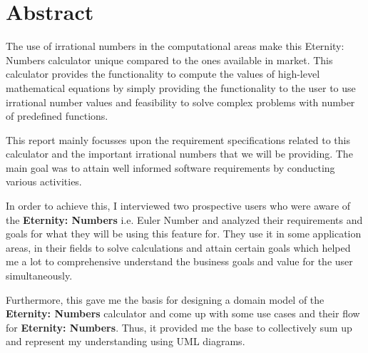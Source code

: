 \documentclass[12pt]{report}
\begin{document}
\vspace{\baselineskip}
\section*{Abstract}

\vspace{\baselineskip}
\begin{justify}
The use of irrational numbers in the computational areas make this Eternity: Numbers calculator unique compared to the ones available in market. This calculator provides the functionality to compute the values of high-level mathematical equations by simply providing the functionality to the user to use irrational number values and feasibility to solve complex problems with number of predefined functions.
\end{justify}\par


\vspace{\baselineskip}
\begin{justify}
This report mainly focusses upon the requirement specifications related to this calculator and the important irrational numbers that we will be providing. The main goal was to attain well informed software requirements by conducting various activities.
\end{justify}\par


\vspace{\baselineskip}
\begin{justify}
In order to achieve this, I interviewed two prospective users who were aware of the \textbf{Eternity: Numbers}  i.e. Euler Number and analyzed their requirements and goals for what they will be using this feature for. They use it in some application areas, in their fields to solve calculations and attain certain goals which helped me a lot to comprehensive understand the business goals and value for the user simultaneously.
\end{justify}\par


\vspace{\baselineskip}
\begin{justify}
Furthermore, this gave me the basis for designing a domain model of the \textbf{Eternity: Numbers} calculator and come up with some use cases and their flow for \textbf{Eternity: Numbers}. Thus, it provided me the base to collectively sum up and represent my understanding using UML diagrams.
\end{justify}\par
\end{document}
